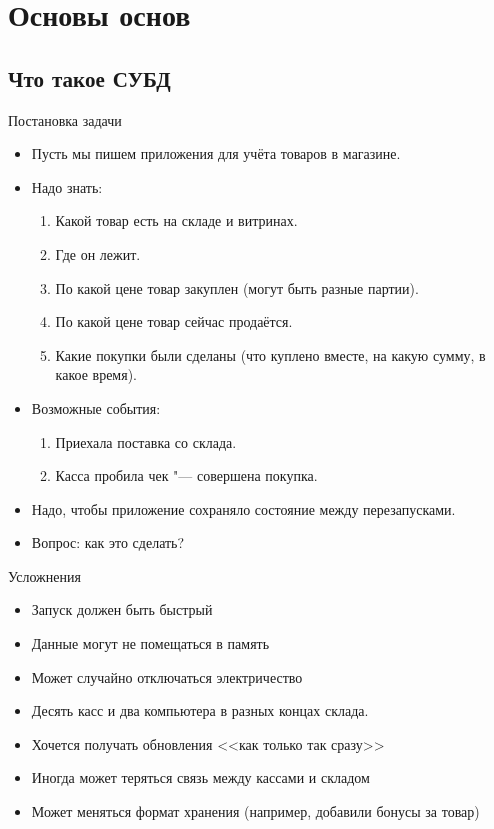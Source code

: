 \section{Основы основ}
\subsection{Что такое СУБД}

\begin{frame}
\end{frame}

\begin{frame}{Постановка задачи}
	\begin{itemize}
		\item Пусть мы пишем приложения для учёта товаров в магазине.
		\item Надо знать:
			\begin{enumerate}
				\item Какой товар есть на складе и витринах.
				\item Где он лежит.
				\item По какой цене товар закуплен (могут быть разные партии).
				\item По какой цене товар сейчас продаётся.
				\item Какие покупки были сделаны (что куплено вместе, на какую сумму, в какое время).
			\end{enumerate}
		\item Возможные события:
			\begin{enumerate}
				\item Приехала поставка со склада.
				\item Касса пробила чек "--- совершена покупка.
			\end{enumerate}
		\item Надо, чтобы приложение сохраняло состояние между перезапусками.
		\item Вопрос: как это сделать?
	\end{itemize}
\end{frame}

\begin{frame}{Усложнения}
	\begin{itemize}
		\item Запуск должен быть быстрый
		\item Данные могут не помещаться в память
		\item Может случайно отключаться электричество
		\item Десять касс и два компьютера в разных концах склада.
		\item Хочется получать обновления <<как только так сразу>>
		\item Иногда может теряться связь между кассами и складом
		\item Может меняться формат хранения (например, добавили бонусы за товар)
	\end{itemize}
\end{frame}

